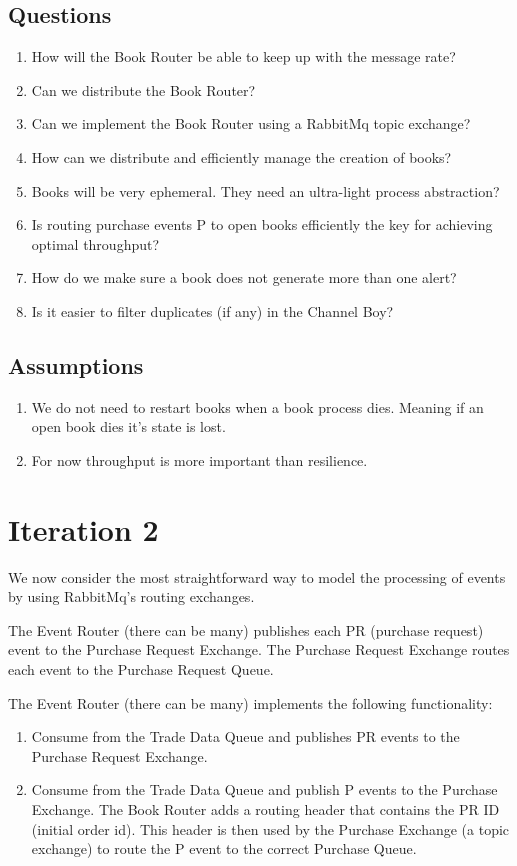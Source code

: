 \documentclass[captions=tableheading]{scrreprt}
\begin{document}
\subsection{Questions}
\label{sec:orgheadline12}
\begin{enumerate}
\item How will the Book Router be able to keep up with the message rate?
\item Can we distribute the Book Router?
\item Can we implement the Book Router using a RabbitMq topic exchange?
\item How can we distribute and efficiently manage the creation of books?
\item Books will be very ephemeral. They need an ultra-light process
abstraction?
\item Is routing purchase events P to open books efficiently the key for
achieving optimal throughput?
\item How do we make sure a book does not generate more than one alert?
\item Is it easier to filter duplicates (if any) in the Channel Boy?
\end{enumerate}

\subsection{Assumptions}
\label{sec:orgheadline13}
\begin{enumerate}
\item We do not need to restart books when a book process dies. Meaning
if an open book dies it's state is lost.
\item For now throughput is more important than resilience.
\end{enumerate}

\section{Iteration 2}
\label{sec:orgheadline17}
We now consider the most straightforward way to model the processing
of events by using RabbitMq's routing exchanges.

The Event Router (there can be many) publishes each PR (purchase
request) event to the Purchase Request Exchange. The Purchase Request
Exchange routes each event to the Purchase Request Queue. 

The Event Router (there can be many) implements the following
functionality:
\begin{enumerate}
\item Consume from the Trade Data Queue and publishes PR events to the
Purchase Request Exchange.
\item Consume from the Trade Data Queue and publish P events to the
Purchase Exchange. The Book Router adds a routing header that
contains the PR ID (initial order id). This header is then used
by the Purchase Exchange (a topic exchange) to route the P event to
the correct Purchase Queue.
\end{enumerate}
\end{document}

